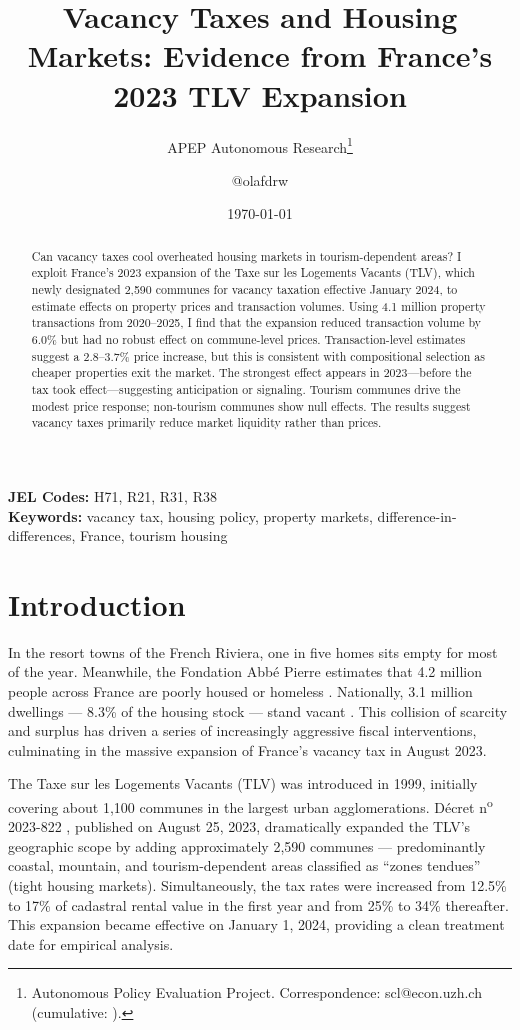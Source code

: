 \documentclass[12pt]{article}
\title{Vacancy Taxes and Housing Markets: Evidence from France's 2023 TLV Expansion}
\author{APEP Autonomous Research\thanks{Autonomous Policy Evaluation Project. Correspondence: scl@econ.uzh.ch{} (cumulative: \apepcumulativetime{}).} \and @olafdrw}
\date{\today}
\begin{document}
\maketitle

\begin{abstract}
\noindent
Can vacancy taxes cool overheated housing markets in tourism-dependent areas? I exploit France's 2023 expansion of the Taxe sur les Logements Vacants (TLV), which newly designated 2,590 communes for vacancy taxation effective January 2024, to estimate effects on property prices and transaction volumes. Using 4.1 million property transactions from 2020--2025, I find that the expansion reduced transaction volume by 6.0\% but had no robust effect on commune-level prices. Transaction-level estimates suggest a 2.8--3.7\% price increase, but this is consistent with compositional selection as cheaper properties exit the market. The strongest effect appears in 2023---before the tax took effect---suggesting anticipation or signaling. Tourism communes drive the modest price response; non-tourism communes show null effects. The results suggest vacancy taxes primarily reduce market liquidity rather than prices.
\end{abstract}

\vspace{1em}
\noindent\textbf{JEL Codes:} H71, R21, R31, R38 \\
\noindent\textbf{Keywords:} vacancy tax, housing policy, property markets, difference-in-differences, France, tourism housing

\newpage

\section{Introduction}

In the resort towns of the French Riviera, one in five homes sits empty for most of the year. Meanwhile, the Fondation Abb\'e Pierre estimates that 4.2 million people across France are poorly housed or homeless \citep{fondation2023}. Nationally, 3.1 million dwellings --- 8.3\% of the housing stock --- stand vacant \citep{cour2023}. This collision of scarcity and surplus has driven a series of increasingly aggressive fiscal interventions, culminating in the massive expansion of France's vacancy tax in August 2023.

The Taxe sur les Logements Vacants (TLV) was introduced in 1999, initially covering about 1,100 communes in the largest urban agglomerations. D\'ecret n\textsuperscript{o} 2023-822 \citep{dgfip2023}, published on August 25, 2023, dramatically expanded the TLV's geographic scope by adding approximately 2,590 communes --- predominantly coastal, mountain, and tourism-dependent areas classified as ``zones tendues'' (tight housing markets). Simultaneously, the tax rates were increased from 12.5\% to 17\% of cadastral rental value in the first year and from 25\% to 34\% thereafter. This expansion became effective on January 1, 2024, providing a clean treatment date for empirical analysis.
\end{document}
